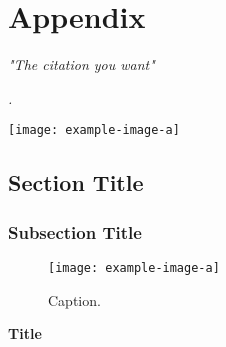 
\chapter[\textcolor{darkblue}{Appendix Toc}]{Appendix}


\parbox[c][5cm][c]{9cm}{

\vspace*{4cm}
\textit{\hspace{2.5cm} "The citation you want"}

\begin{tBox}

\textit{\large
\lipsum[1].}
\vspace*{0.2cm}

\textit{\large
\lipsum[2]} 

\end{tBox}
\vspace*{0.2cm}
}

\vspace*{9cm}

\begin{minipage}[c][5cm][c]{9cm}
\centering
\texttt{[image: example-image-a]}
\label{fig:aim}
\end{minipage}

\clearpage

\section{Section Title}

\subsection{Subsection Title}

\lipsum[1]

\begin{figure}[h!]
    \centering
    \texttt{[image: example-image-a]}
    \caption[Caption in the toc]{Caption.}
    \label{fig:figname}
\end{figure}

\lipsum[2]

\begin{eve}
    \lipsum[1]
\end{eve}

\begin{definition}{\textbf{Title}}
    \lipsum[2]
\label{def:name}

\end{definition}

